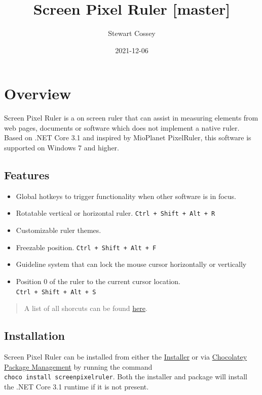 \documentclass[
]{book}
\title{Screen Pixel Ruler {[}master{]}}
\author{Stewart Cossey}
\date{2021-12-06}
\providecommand{\tightlist}{%
  \setlength{\itemsep}{0pt}\setlength{\parskip}{0pt}}
\begin{document}
\maketitle

{
\setcounter{tocdepth}{1}
\tableofcontents
}
\hypertarget{overview}{%
\chapter{Overview}\label{overview}}

Screen Pixel Ruler is a on screen ruler that can assist in measuring elements from web pages, documents or software which does not implement a native ruler.
Based on .NET Core 3.1 and inspired by MioPlanet PixelRuler, this software is supported on Windows 7 and higher.

\hypertarget{features}{%
\section{Features}\label{features}}

\begin{itemize}
\tightlist
\item
  Global hotkeys to trigger functionality when other software is in focus.
\item
  Rotatable vertical or horizontal ruler. \texttt{Ctrl\ +\ Shift\ +\ Alt\ +\ R}
\item
  Customizable ruler themes.
\item
  Freezable position. \texttt{Ctrl\ +\ Shift\ +\ Alt\ +\ F}
\item
  Guideline system that can lock the mouse cursor horizontally or vertically
\item
  Position 0 of the ruler to the current cursor location. \texttt{Ctrl\ +\ Shift\ +\ Alt\ +\ S}
\end{itemize}

\begin{quote}
A list of all shorcuts can be found \protect\hyperlink{keyboard}{here}.
\end{quote}

\hypertarget{installation}{%
\section{Installation}\label{installation}}

Screen Pixel Ruler can be installed from either the \href{https://github.com/Cossey/ScreenPixelRuler2/releases}{Installer} or via \href{https://chocolatey.org}{Chocolatey Package Management} by running the command \texttt{choco\ install\ screenpixelruler}.
Both the installer and package will install the .NET Core 3.1 runtime if it is not present.
\end{document}
